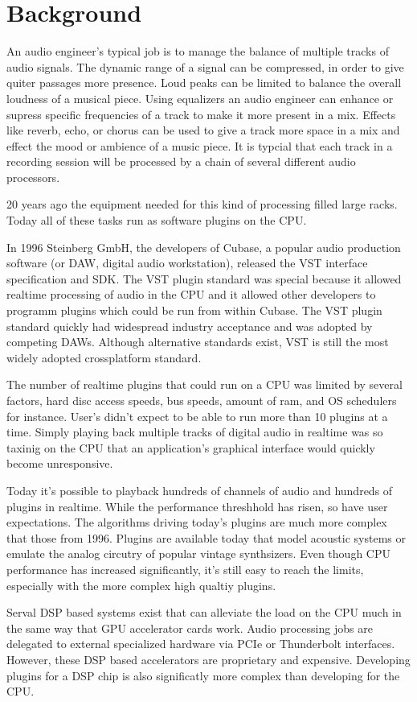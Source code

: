 \section{Background}

An audio engineer's typical job is to manage the balance of multiple tracks of audio signals. The dynamic range of a signal can be compressed, in order to give quiter passages more presence. Loud peaks can be limited to balance the overall loudness of a musical piece. Using equalizers an audio engineer can enhance or supress specific frequencies of a track to make it more present in a mix. Effects like reverb, echo, or chorus can be used to give a track more space in a mix and effect the mood or ambience of a music piece. It is typcial that each track in a recording session will be processed by a chain of several different audio processors.

20 years ago the equipment needed for this kind of processing filled large racks. Today all of these tasks run as software plugins on the CPU.

In 1996 Steinberg GmbH, the developers of Cubase, a popular audio production software (or DAW, digital audio workstation), released the VST interface specification and SDK.\cite{VST-wikipedia} The VST plugin standard was special because it allowed realtime processing of audio in the CPU and it allowed other developers to programm plugins which could be run from within Cubase. The VST plugin standard quickly had widespread industry acceptance and was adopted by competing DAWs. Although alternative standards exist, VST is still the most widely adopted crossplatform standard.

The number of realtime plugins that could run on a CPU was limited by several factors, hard disc access speeds, bus speeds, amount of ram, and OS schedulers for instance\cite{brandt1998low}. User's didn't expect to be able to run more than 10 plugins at a time. Simply playing back multiple tracks of digital audio in realtime was so taxinig on the CPU that an application's graphical interface would quickly become unresponsive.

Today it's possible to playback hundreds of channels of audio and hundreds of plugins in realtime. While the performance threshhold has risen, so have user expectations. The algorithms driving today's plugins are much more complex that those from 1996. Plugins are available today that model acoustic systems or emulate the analog circutry of popular vintage synthsizers. Even though CPU performance has increased significantly, it's still easy to reach the limits, especially with the more complex high qualtiy plugins.

Serval DSP based systems exist that can alleviate the load on the CPU much in the same way that GPU accelerator cards work. Audio processing jobs are delegated to external specialized hardware via PCIe or Thunderbolt interfaces. However, these DSP based accelerators are proprietary and expensive. Developing plugins for a DSP chip is also significatly more complex than developing for the CPU.

